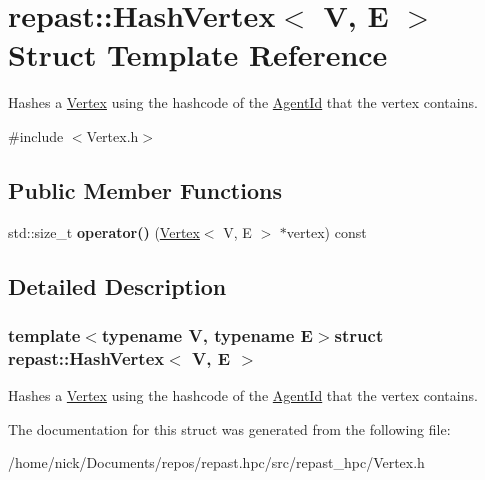 \hypertarget{structrepast_1_1_hash_vertex}{\section{repast\-:\-:Hash\-Vertex$<$ V, E $>$ Struct Template Reference}
\label{structrepast_1_1_hash_vertex}
}


Hashes a \hyperlink{classrepast_1_1_vertex}{Vertex} using the hashcode of the \hyperlink{classrepast_1_1_agent_id}{Agent\-Id} that the vertex contains.  




{\ttfamily \#include $<$Vertex.\-h$>$}

\subsection*{Public Member Functions}
\begin{DoxyCompactItemize}
\item 
\hypertarget{structrepast_1_1_hash_vertex_a675c035c3939548181bce7e09bcb01b0}{std\-::size\-\_\-t {\bfseries operator()} (\hyperlink{classrepast_1_1_vertex}{Vertex}$<$ V, E $>$ $\ast$vertex) const }\label{structrepast_1_1_hash_vertex_a675c035c3939548181bce7e09bcb01b0}

\end{DoxyCompactItemize}


\subsection{Detailed Description}
\subsubsection*{template$<$typename V, typename E$>$struct repast\-::\-Hash\-Vertex$<$ V, E $>$}

Hashes a \hyperlink{classrepast_1_1_vertex}{Vertex} using the hashcode of the \hyperlink{classrepast_1_1_agent_id}{Agent\-Id} that the vertex contains. 

The documentation for this struct was generated from the following file\-:\begin{DoxyCompactItemize}
\item 
/home/nick/\-Documents/repos/repast.\-hpc/src/repast\-\_\-hpc/Vertex.\-h\end{DoxyCompactItemize}
